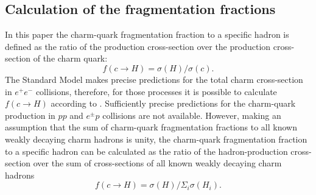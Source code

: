 \subsection{Calculation of the fragmentation fractions}
\label{sec:comb::ffdef}
In this paper the charm-quark  fragmentation fraction to a specific 
hadron is defined as the ratio of the production cross-section over the 
production cross-section of the charm quark:
\begin{equation}\label{eq:ffwithcharmcs}
f(c \rightarrow H) = {\sigma(H)}/{\sigma(c)}. 
\end{equation}
The Standard Model makes precise predictions for the total charm 
cross-section in $e^+e^-$ collisions, therefore, for those processes it 
is possible to calculate $f(c \rightarrow H)$ according to 
.
%
Sufficiently precise predictions for the charm-quark production 
in $pp$ and $e^{\pm}p$ collisions are not available.
%
However, making an assumption that the sum of charm-quark fragmentation 
fractions to all known weakly decaying charm hadrons is unity, the 
charm-quark fragmentation fraction to a specific hadron can be 
calculated as the ratio of the hadron-production cross-section over the 
sum of cross-sections of all known weakly decaying  charm hadrons
\begin{equation}\label{eq:ffwithsumh}
f(c\rightarrow H)={\sigma(H)}/{\Sigma_{i}\sigma(H_{i})}. 
\end{equation}

